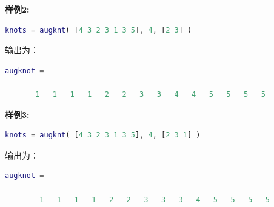 \textbf{样例2:}

\begin{lstlisting}[language = matlab]
    knots = augknt( [4 3 2 3 1 3 5], 4, [2 3] )
\end{lstlisting}

 输出为：
\begin{lstlisting}[language = matlab ]
    augknot = 

       1   1   1   1   2   2   3   3   4   4   5   5   5   5
\end{lstlisting}

\textbf{样例3:}

\begin{lstlisting}[language = matlab]
    knots = augknt( [4 3 2 3 1 3 5], 4, [2 3 1] )
\end{lstlisting}

 输出为：
\begin{lstlisting}[language = matlab ]
    augknot = 

        1   1   1   1   2   2   3   3   3   4   5   5   5   5
\end{lstlisting}